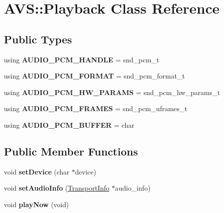 \hypertarget{classAVS_1_1Playback}{}\section{A\+VS\+:\+:Playback Class Reference}
\label{classAVS_1_1Playback}
\subsection*{Public Types}
\begin{DoxyCompactItemize}
\item 
\mbox{\label{classAVS_1_1Playback_ad56cd1ba1a3738f36bd0b8ee5567c0c4}} 
using {\bfseries A\+U\+D\+I\+O\+\_\+\+P\+C\+M\+\_\+\+H\+A\+N\+D\+LE} = snd\+\_\+pcm\+\_\+t
\item 
\mbox{\label{classAVS_1_1Playback_a80550d32c1003a4826fea8836c5b87ce}} 
using {\bfseries A\+U\+D\+I\+O\+\_\+\+P\+C\+M\+\_\+\+F\+O\+R\+M\+AT} = snd\+\_\+pcm\+\_\+format\+\_\+t
\item 
\mbox{\label{classAVS_1_1Playback_a2cca034f6898bbed39615e50490bb3a2}} 
using {\bfseries A\+U\+D\+I\+O\+\_\+\+P\+C\+M\+\_\+\+H\+W\+\_\+\+P\+A\+R\+A\+MS} = snd\+\_\+pcm\+\_\+hw\+\_\+params\+\_\+t
\item 
\mbox{\label{classAVS_1_1Playback_a187386637ffd0f626b1a953bcdb53644}} 
using {\bfseries A\+U\+D\+I\+O\+\_\+\+P\+C\+M\+\_\+\+F\+R\+A\+M\+ES} = snd\+\_\+pcm\+\_\+uframes\+\_\+t
\item 
\mbox{\label{classAVS_1_1Playback_a1aa4eefd38175724607cb4cfc5f184ef}} 
using {\bfseries A\+U\+D\+I\+O\+\_\+\+P\+C\+M\+\_\+\+B\+U\+F\+F\+ER} = char
\end{DoxyCompactItemize}
\subsection*{Public Member Functions}
\begin{DoxyCompactItemize}
\item 
\mbox{\label{classAVS_1_1Playback_a28ba8c3aaabd4a29183b42856de11ac8}} 
void {\bfseries set\+Device} (char $\ast$device)
\item 
\mbox{\label{classAVS_1_1Playback_a9c03d3839924767c09cfe9ed0de29a3e}} 
void {\bfseries set\+Audio\+Info} (\hyperlink{classAlexaEvent_1_1TransportInfo}{Transport\+Info} $\ast$audio\+\_\+info)
\item 
\mbox{\label{classAVS_1_1Playback_adeb9afd4b8ade58c8559185f7a6e94eb}} 
void {\bfseries play\+Now} (void)
\end{DoxyCompactItemize}
